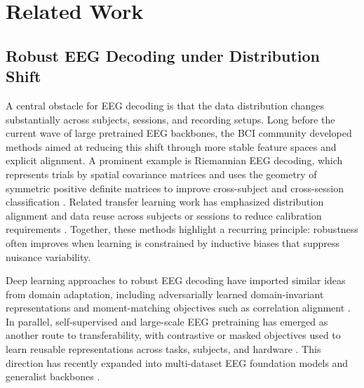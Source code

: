 \documentclass[12pt]{article}
\begin{document}
\section{Related Work}

\subsection{Robust EEG Decoding under Distribution Shift}
A central obstacle for EEG decoding is that the data distribution changes substantially
across subjects, sessions, and recording setups. Long before the current wave of large
pretrained EEG backbones, the BCI community developed methods aimed at reducing this
shift through more stable feature spaces and explicit alignment. A prominent example is
Riemannian EEG decoding, which represents trials by spatial covariance matrices and
uses the geometry of symmetric positive definite matrices to improve cross-subject and
cross-session classification \citep{Barachant2012RiemannianBCI}. Related transfer
learning work has emphasized distribution alignment and data reuse across subjects or
sessions to reduce calibration requirements
\citep{Jayaram2016TransferLearningBCI,Zanini2018RiemannianTL,HeWu2020EuclideanAlignment}.
Together, these methods highlight a recurring principle: robustness often improves when
learning is constrained by inductive biases that suppress nuisance variability.

Deep learning approaches to robust EEG decoding have imported similar ideas from
domain adaptation, including adversarially learned domain-invariant representations
\citep{Ganin2016DANN} and moment-matching objectives such as correlation alignment
\citep{SunSaenko2016DeepCORAL}. In parallel, self-supervised and large-scale EEG
pretraining has emerged as another route to transferability, with contrastive or masked
objectives used to learn reusable representations across tasks, subjects, and hardware
\citep{Kostas2021BENDR}. This direction has recently expanded into multi-dataset EEG
foundation models and generalist backbones
\citep{wang2024eegpt,Jiang2024LaBraM,Chen2024EEGFormer,Wang2025EEGMamba,ElOuahidi2025REVE,Yue2024BrainGPT}.
\end{document}
